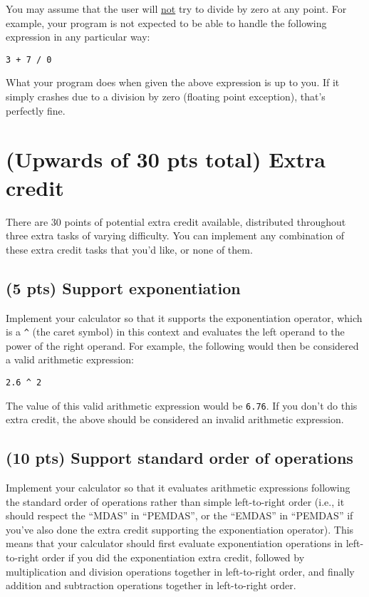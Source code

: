 \documentclass{article}
\begin{document}
You may assume that the user will \ul{not} try to divide by zero at any point. For example, your program is not expected to be able to handle the following expression in any particular way:

\begin{verbatim}
3 + 7 / 0
\end{verbatim}

What your program does when given the above expression is up to you. If it simply crashes due to a division by zero (floating point exception), that's perfectly fine.

\section{(Upwards of 30 pts total) Extra credit}

There are 30 points of potential extra credit available, distributed throughout three extra tasks of varying difficulty. You can implement any combination of these extra credit tasks that you'd like, or none of them.

\subsection{(5 pts) Support exponentiation}

Implement your calculator so that it supports the exponentiation operator, which is a \texttt{\^} (the caret symbol) in this context and evaluates the left operand to the power of the right operand. For example, the following would then be considered a valid arithmetic expression:

\begin{verbatim}
2.6 ^ 2
\end{verbatim}

The value of this valid arithmetic expression would be \texttt{6.76}. If you don't do this extra credit, the above should be considered an invalid arithmetic expression.

\subsection{(10 pts) Support standard order of operations}

Implement your calculator so that it evaluates arithmetic expressions following the standard order of operations rather than simple left-to-right order (i.e., it should respect the ``MDAS'' in ``PEMDAS'', or the ``EMDAS'' in ``PEMDAS'' if you've also done the extra credit supporting the exponentiation operator). This means that your calculator should first evaluate exponentiation operations in left-to-right order if you did the exponentiation extra credit, followed by multiplication and division operations together in left-to-right order, and finally addition and subtraction operations together in left-to-right order.
\end{document}
